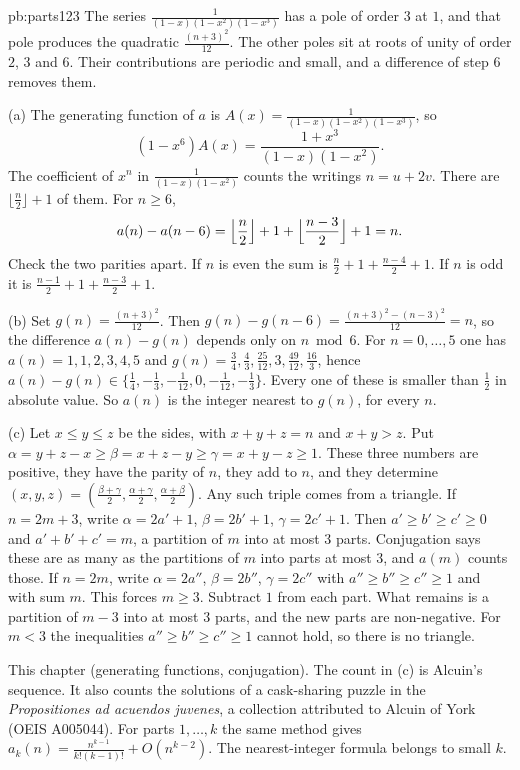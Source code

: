 \begin{solution}{pb:parts123}
\idea The series $\frac1{(1-x)(1-x^2)(1-x^3)}$ has a pole of order $3$ at $1$, and that pole produces the quadratic $\frac{(n+3)^2}{12}$. The other poles sit at roots of unity of order $2$, $3$ and $6$. Their contributions are periodic and small, and a difference of step $6$ removes them.

\writeup (a) The generating function of $a$ is $A(x)=\frac1{(1-x)(1-x^2)(1-x^3)}$, so
\[
(1-x^6)A(x)=\frac{1+x^3}{(1-x)(1-x^2)}.
\]
The coefficient of $x^n$ in $\frac1{(1-x)(1-x^2)}$ counts the writings $n=u+2v$. There are $\lfloor\frac n2\rfloor+1$ of them. For
$n\ge6$,
\[
a(n)-a(n-6)=\Bigl\lfloor\frac n2\Bigr\rfloor+1+\Bigl\lfloor\frac{n-3}2\Bigr\rfloor+1=n.
\]
Check the two parities apart. If $n$ is even the sum is $\frac n2+1+\frac{n-4}2+1$. If $n$ is odd it is $\frac{n-1}2+1+\frac{n-3}2+1$.

(b) Set $g(n)=\frac{(n+3)^2}{12}$. Then $g(n)-g(n-6)=\frac{(n+3)^2-(n-3)^2}{12}=n$, so the difference $a(n)-g(n)$ depends only on $n\bmod6$. For
$n=0,\dots,5$ one has $a(n)=1,1,2,3,4,5$ and $g(n)=\frac34,\frac43,\frac{25}{12},3,\frac{49}{12},\frac{16}3$, hence
$a(n)-g(n)\in\{\frac14,-\frac13,-\frac1{12},0,-\frac1{12},-\frac13\}$. Every one of these is smaller than $\frac12$ in absolute value. So $a(n)$ is
the integer nearest to $g(n)$, for every $n$.

(c) Let $x\le y\le z$ be the sides, with $x+y+z=n$ and $x+y>z$. Put $\alpha=y+z-x\ge\beta=x+z-y\ge\gamma=x+y-z\ge1$. These three numbers are
positive, they have the parity of $n$, they add to $n$, and they determine $(x,y,z)=(\frac{\beta+\gamma}2,\frac{\alpha+\gamma}2,\frac{\alpha+\beta}2)$.
Any such triple comes from a triangle. If $n=2m+3$, write $\alpha=2a'+1$, $\beta=2b'+1$, $\gamma=2c'+1$. Then
$a'\ge b'\ge c'\ge0$ and $a'+b'+c'=m$, a partition of $m$ into at most $3$ parts. Conjugation says these are as many as the
partitions of $m$ into parts at most $3$, and $a(m)$ counts those. If $n=2m$, write $\alpha=2a''$, $\beta=2b''$, $\gamma=2c''$
with $a''\ge b''\ge c''\ge1$ and with sum $m$. This forces $m\ge3$. Subtract $1$ from each part. What remains is a partition of $m-3$ into at most $3$ parts, and the new parts are non-negative. For $m<3$ the inequalities $a''\ge b''\ge c''\ge1$ cannot hold, so there is no triangle.

\tools This chapter (generating functions, conjugation).
\leads The count in (c) is Alcuin's sequence. It also counts the solutions of a cask-sharing puzzle in the
\emph{Propositiones ad acuendos juvenes}, a collection attributed to Alcuin of York (OEIS A005044). For parts $1,\dots,k$ the
same method gives $a_k(n)=\frac{n^{k-1}}{k!(k-1)!}+O(n^{k-2})$. The nearest-integer formula belongs to small $k$.
\end{solution}


